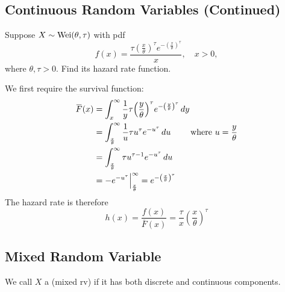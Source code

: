 \documentclass[notoc,notitlepage]{tufte-book}
\begin{document}
\subsection{Continuous Random Variables (Continued)}%
\label{sub:continuous_random_variables_continued}

\begin{eg}\label{eg:weibull_hazard_rate}
  Suppose $X \sim \operatorname{Wei}(\theta, \tau)$ with pdf
  \begin{equation*}
    f(x) = \frac{\tau {\left( \frac{x}{\theta} \right)}^\tau e^{-{\left( \frac{x}{\theta} \right)}^\tau}}{x}, \quad x > 0,
  \end{equation*}
  where $\theta, \tau > 0$. Find its hazard rate function.
\end{eg}

\begin{solution}
  We first require the survival function:
  \begin{align*}
    \bar{F}(x) &= \int_{x}^{\infty} \frac{1}{y} \tau {\left( \frac{y}{\theta} \right)}^\tau e^{-{\left( \frac{y}{\theta} \right)}^\tau} \dif{y} \\
               &= \int_{\frac{x}{\theta}}^{\infty} \frac{1}{u} \tau u^\tau e^{-u^\tau} \dif{u} \qquad \text{ where } u = \frac{y}{\theta} \\
               &= \int_{\frac{x}{\theta}}^{\infty} \tau u^{\tau - 1} e^{-u^\tau} \dif{u} \\
               &= -e^{-u^\tau} \at{\frac{x}{\theta}}{\infty} = e^{-{\left( \frac{x}{\theta} \right)}^\tau}
  \end{align*}
  The hazard rate is therefore
  \begin{equation*}
    h(x) = \frac{f(x)}{\bar{F}(x)} = \frac{\tau}{x} {\left( \frac{x}{\theta} \right)}^\tau
  \end{equation*}
\end{solution}


\subsection{Mixed Random Variable}%
\label{sub:mixed_random_variable}

\begin{defn}\label{defn:mixed_random_variable}
  We call $X$ a  (mixed rv) if it has both discrete and continuous components.
\end{defn}
\end{document}
